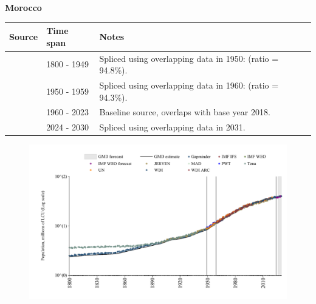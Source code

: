 \documentclass[12pt,a4paper,landscape]{article}
\begin{document}
\begin{adjustbox}{max totalsize={\paperwidth}{\paperheight},center}
\begin{minipage}[t][\textheight][t]{\textwidth}
\vspace*{0.5cm}
{}
\begin{center}
{\Large\bfseries Morocco}
\end{center}
\vspace{0.5cm}
\begin{table}[H]
\centering
\small
\begin{tabular}{|l|l|l|}
\hline
\textbf{Source} & \textbf{Time span} & \textbf{Notes} \\
\hline
\rowcolor{white}\cite{Gapminder}& 1800 - 1949 &Spliced using overlapping data in 1950: (ratio = 94.8\%).\\
\rowcolor{lightgray}\cite{IMF_IFS}& 1950 - 1959 &Spliced using overlapping data in 1960: (ratio = 94.3\%).\\
\rowcolor{white}\cite{WDI}& 1960 - 2023 &Baseline source, overlaps with base year 2018.\\
\rowcolor{lightgray}\cite{Gapminder}& 2024 - 2030 &Spliced using overlapping data in 2031.\\
\hline
\end{tabular}
\end{table}
\begin{figure}[H]
\centering
\includegraphics[width=\textwidth,height=0.6\textheight,keepaspectratio]{graphs/MAR_pop.pdf}
\end{figure}
\end{minipage}
\end{adjustbox}
\end{document}
